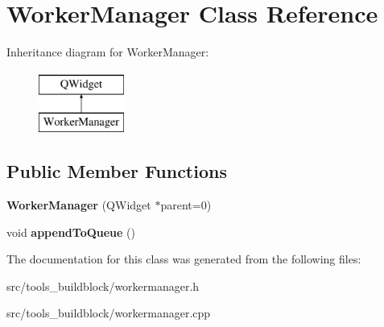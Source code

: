 \hypertarget{classWorkerManager}{}\section{Worker\+Manager Class Reference}
\label{classWorkerManager}
Inheritance diagram for Worker\+Manager\+:\begin{figure}[H]
\begin{center}
\leavevmode
\includegraphics[height=2.000000cm]{classWorkerManager}
\end{center}
\end{figure}
\subsection*{Public Member Functions}
\begin{DoxyCompactItemize}
\item 
\mbox{\label{classWorkerManager_ad04a87bc7a60cea19c8ba5f480812a96}} 
{\bfseries Worker\+Manager} (Q\+Widget $\ast$parent=0)
\item 
\mbox{\label{classWorkerManager_a10a8c619bf754a0c7cf8f8ac49b406fc}} 
void {\bfseries append\+To\+Queue} ()
\end{DoxyCompactItemize}


The documentation for this class was generated from the following files\+:\begin{DoxyCompactItemize}
\item 
src/tools\+\_\+buildblock/workermanager.\+h\item 
src/tools\+\_\+buildblock/workermanager.\+cpp\end{DoxyCompactItemize}

